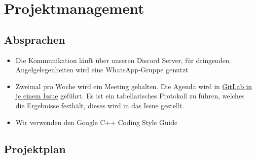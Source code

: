 \chapter{Projektmanagement}\label{ch:projektmanagement}






\section{Absprachen}\label{sec:absprachen}

\begin{itemize}
    \item Die Kommunikation läuft über unseren Discord Server, für dringenden Angelgelegenheiten
    wird eine WhatsApp-Gruppe genutzt
    \item Zweimal pro Woche wird ein Meeting gehalten.
    Die Agenda wird in
    \href{https://git.haw-hamburg.de/ss21-esep-gruppe-2.3/esep/-/boards/2082?label_name[]=Protokoll}
    {GitLab in je einem Issue} geführt.
    Es ist ein tabellarisches Protokoll zu führen, welches die Ergebnisse festhält, dieses wird
    in das Issue gestellt.
    \item Wir verwenden den Google C++ Coding Style Guide
\end{itemize}



\section{Projektplan}\label{sec:projektplan}

